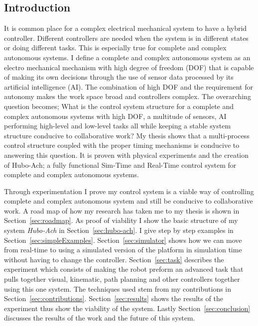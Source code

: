 \subsection{Introduction}



It is common place for a complex electrical mechanical system to have a hybrid controller.  
Different controllers are needed when the system is in different states or doing different tasks.
This is especially true for complete and complex autonomous systems.
I define a complete and complex autonomous system as an electro mechanical mechanism with high degree of freedom (DOF) that is capable of making its own decisions through the use of sensor data processed by its artificial intelligence (AI).
The combination of high DOF and the requirement for autonomy makes the work space broad and controllers complex.
The overarching question becomes; What is the control system structure for a complete and complex autonomous systems with high DOF, a multitude of sensors, AI performing high-level and low-level tasks all while keeping a stable system structure conducive to collaborative work?
My thesis shows that a multi-process control structure coupled with the proper timing mechanisms is conducive to answering this question.
It is proven with physical experiments and the creation of Hubo-Ach\cite{lofaroRAM2013}; a fully functional Sim-Time and Real-Time control system for complete and complex autonomous systems.

Through experimentation I prove my control system is a viable way of controlling complete and complex autonomous system and still be conducive to collaborative work.  
A road map of how my research has taken me to my thesis is shown in Section~\ref{sec:roadmap}.
As proof of viability I show the basic structure of my system \textit{Hubo-Ach} in Section~\ref{sec:hubo-ach}\cite{lofaroRAM2013}.  
I give step by step examples in Section~\ref{sec:simpleExamples}.
Section~\ref{sec:simulator} shows how we can move from real-time to using a simulated version of the platform in simulation time without having to change the controller.
Section~\ref{sec:task} describes the experiment which consists of making the robot preform an advanced task that pulls together visual, kinematic, path planning and other controllers together using this one system.
The techniques used stem from my contributions in Section~\ref{sec:contributions}.
Section~\ref{sec:results} shows the results of the experiment thus show the viability of the system.
Lastly Section~\ref{sec:conclusion} discusses the results of the work and the future of this system.

